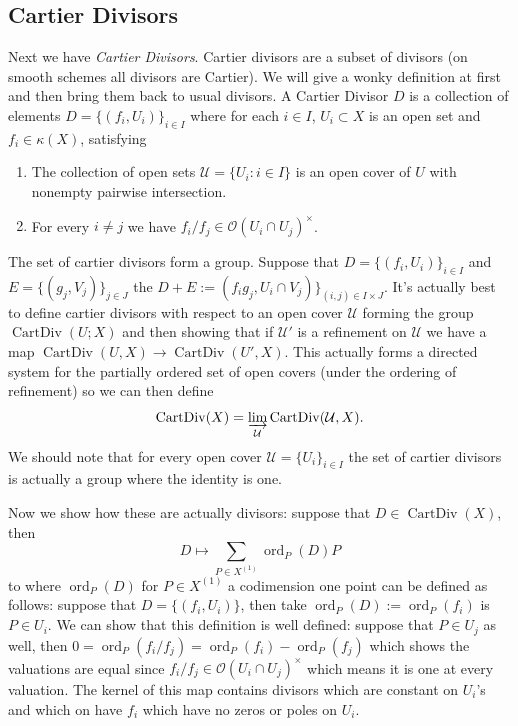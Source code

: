 \documentclass[12pt]{article}
\numberwithin{equation}{section}
\theoremstyle{definition}
\theoremstyle{remark}
\newcommand{\ord}{\operatorname{ord}}
\newcommand{\CartDiv}{\operatorname{CartDiv}}
\begin{document}
\subsection{Cartier Divisors}
Next we have \emph{Cartier Divisors}. Cartier divisors are a subset of divisors (on smooth schemes all divisors are Cartier). We will give a wonky definition at first and then bring them back to usual divisors. 
A Cartier Divisor $D$ is a collection of elements $D=\lbrace (f_i,U_i) \rbrace_{i\in I}$ where for each $i\in I$, $U_i\subset X$ is an open set and $f_i\in \kappa(X)$, satisfying
\begin{enumerate}
	\item The collection of open sets $\mathcal U = \lbrace U_i:i\in I\rbrace$ is an open cover of $U$ with nonempty pairwise intersection.
	\item For every $i\neq j$ we have $f_i/f_j\in \mathcal O(U_i\cap U_j)^{\times}$.
\end{enumerate}
The set of cartier divisors form a group. Suppose that $D = \lbrace (f_i,U_i)\rbrace_{i\in I}$ and $E = \lbrace (g_j,V_j)\rbrace_{j\in J}$ the $D+E:= (f_ig_j,U_i\cap V_j)\rbrace_{(i,j)\in I\times J}$. It's actually best to define cartier divisors with respect to an open cover $\mathcal U$ forming the group $\CartDiv(U;X)$ and then showing that if $\mathcal U'$ is a refinement on $\mathcal U$ we have a map $\CartDiv(U,X)\to \CartDiv(U',X)$. This actually forms a directed system for the partially ordered set of open covers (under the ordering of refinement) so we can then define
$$\CartDiv(X) = \varinjlim_{\mathcal U} \CartDiv(\mathcal U,X).$$
We should note that for every open cover $\mathcal U = \lbrace U_i \rbrace_{i\in I}$ the set of cartier divisors is actually a group where the identity is one.

Now we show how these are actually divisors: suppose that $D\in \CartDiv(X)$, then 
\begin{equation} \label{eqn:cartier_to_weil}
D\mapsto\sum_{P\in X^{(1)}} \ord_P(D) P
\end{equation}
to where $\ord_P(D)$ for $P \in X^{(1)}$ a codimension one point can be defined as follows: suppose that $D=\lbrace(f_i,U_i)\rbrace$, then take $\ord_P(D):= \ord_P(f_i)$ is $P\in U_i$. We can show that this definition is well defined: suppose that $P\in U_j$ as well, then 
$0=\ord_P(f_i/f_j)=\ord_P(f_i) - \ord_P(f_j)$
which shows the valuations are equal since $f_i/f_j\in \mathcal O(U_i\cap U_j)^{\times}$ which means it is one at every valuation. The kernel of this map contains divisors which are constant on $U_i$'s and which on have $f_i$ which have no zeros or poles on $U_i$.
\end{document}
